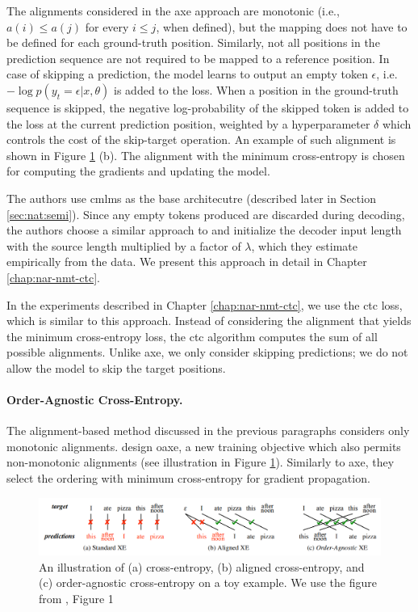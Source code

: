The alignments considered in the \ac{axe} approach are monotonic (i.e.,
$a(i) \leq a(j)$ for every $i \leq j$, when defined), but the mapping does not
have to be defined for each ground-truth position. Similarly, not all positions
in the prediction sequence are not required to be mapped to a reference
position.  In case of skipping a prediction, the model learns to output an
empty token $\epsilon$, i.e. $-\log p(y_t = \epsilon | x, \theta)$ is added to
the loss.  When a position in the ground-truth sequence is skipped, the
negative log-probability of the skipped token is added to the loss at the
current prediction position, weighted by a hyperparameter $\delta$ which
controls the cost of the skip-target operation. An example of such alignment is
shown in Figure \ref{fig:oaxe-example} (b). The alignment with the minimum
cross-entropy is chosen for computing the gradients and updating the model.

The authors use \aclp{cmlm} as the base architecutre (described later in
Section \ref{sec:nat:semi}).  Since any empty tokens produced are discarded
during decoding, the authors choose a similar approach to
\citet{libovicky-helcl-2018-end} and initialize the decoder input length with
the source length multiplied by a factor of $\lambda$, which they estimate
empirically from the data. We present this approach in detail in Chapter
\ref{chap:nar-nmt-ctc}.

In the experiments described in Chapter \ref{chap:nar-nmt-ctc}, we use the
\ac{ctc} loss, which is similar to this approach. Instead of considering the
alignment that yields the minimum cross-entropy loss, the \ac{ctc} algorithm
computes the sum of all possible alignments. Unlike \ac{axe}, we only consider
skipping predictions; we do not allow the model to skip the target positions.

\paragraph{Order-Agnostic Cross-Entropy.} The alignment-based method discussed
in the previous paragraphs considers only monotonic
alignments. \citet{du2021orderagnostic} design \ac{oaxe}, a new training
objective which also permits non-monotonic alignments (see illustration in
Figure \ref{fig:oaxe-example}). Similarly to \ac{axe}, they select the ordering
with minimum cross-entropy for gradient propagation.

\begin{figure}
  \centering
  \includegraphics[width=\textwidth]{img/oaxe.png}

  \caption{An illustration of (a) cross-entropy, (b) aligned cross-entropy, and
    (c) order-agnostic cross-entropy on a toy example. We use the figure from
    \citet{du2021orderagnostic}, Figure 1}%
  \label{fig:oaxe-example}
\end{figure}

